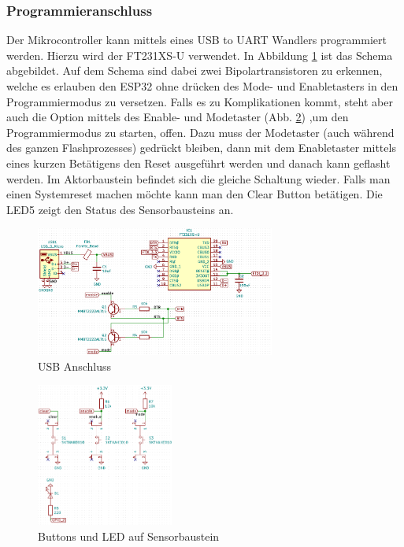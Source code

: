 \subsubsection{Programmieranschluss}
\label{par: Programmieranschluss}
Der Mikrocontroller kann mittels eines USB to UART Wandlers programmiert werden. Hierzu wird der FT231XS-U verwendet. In Abbildung \ref{pic: USB Anschluss} ist das Schema abgebildet. Auf dem Schema sind dabei zwei Bipolartransistoren zu erkennen, welche es erlauben den ESP32 ohne drücken des Mode- und Enabletasters in den Programmiermodus zu versetzen. Falls es zu Komplikationen kommt, steht aber auch die Option mittels des Enable- und Modetaster (Abb. \ref{pic: sensor_progrmmierbuttons}) ,um den Programmiermodus zu starten, offen. Dazu muss der Modetaster (auch während des ganzen Flashprozesses) gedrückt bleiben, dann mit dem Enabletaster mittels eines kurzen Betätigens den Reset ausgeführt werden und danach kann geflasht werden. Im Aktorbaustein befindet sich die gleiche Schaltung wieder. Falls man einen Systemreset machen möchte kann man den Clear Button betätigen. Die LED5 zeigt den Status des Sensorbausteins an.
\begin{figure}[h!]
	\centering
	\includegraphics[width=0.7\textwidth]{graphics/shematics_usb.png}
	\caption{USB Anschluss}
	\label{pic: USB Anschluss}
\end{figure}
\begin{figure}[h!]
	\centering
	\includegraphics[width=0.4\textwidth]{graphics/shematics_sensor_buttons_LED.png}
	\caption{Buttons und LED auf Sensorbaustein}
	\label{pic: sensor_progrmmierbuttons}
\end{figure}


